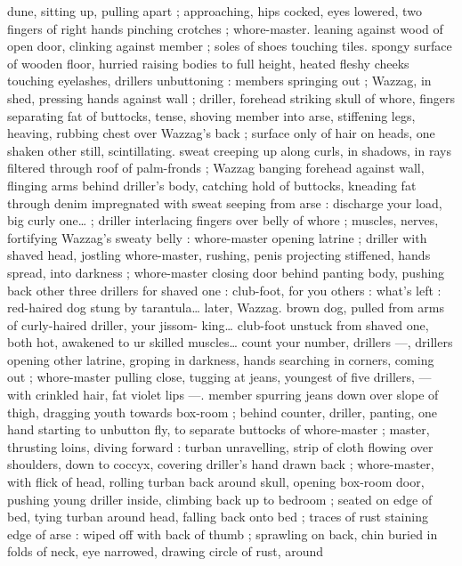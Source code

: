 dune, sitting up, pulling apart ; approaching, hips cocked, eyes 
lowered, two fingers of right hands pinching crotches ; whore-master. 
leaning against wood of open door, clinking against member ; soles 
of shoes touching tiles. spongy surface of wooden floor, hurried 
raising bodies to full height, heated fleshy cheeks touching 
eyelashes, drillers unbuttoning : members springing out ; Wazzag, in 
shed, pressing hands against wall ; driller, forehead striking skull of 
whore, fingers separating fat of buttocks, tense, shoving member 
into arse, stiffening legs, heaving, rubbing chest over Wazzag's back 
; surface only of hair on heads, one shaken other still, scintillating. 
sweat creeping up along curls, in shadows, in rays filtered through 
roof of palm-fronds ; Wazzag banging forehead against wall, flinging 
arms behind driller's body, catching hold of buttocks, kneading fat 
through denim impregnated with sweat seeping from arse :{\td} {\gl}{\td} 
discharge your load, big curly one{\ldots}{\gr} ; driller interlacing fingers over 
belly of whore ; muscles, nerves, fortifying Wazzag's sweaty belly : 
whore-master opening latrine ; driller with shaved head, jostling 
whore-master, rushing, penis projecting stiffened, hands spread, into 
darkness ; whore-master closing door behind panting body, pushing 
back other three drillers{\td} {\gl} for shaved one : club-foot, for you others 
: what's left : red-haired dog stung by tarantula{\ldots} later, Wazzag. 
brown dog, pulled from arms of curly-haired driller, your jissom- 
king{\ldots} club-foot unstuck from shaved one, both hot, awakened to 
ur skilled muscles{\ldots} count your number, drillers{\td} {\gr} ---, drillers 
opening other latrine, groping in darkness, hands searching in 
corners, coming out ; whore-master pulling close, tugging at jeans, 
youngest of five drillers, --- with crinkled hair, fat violet lips ---. 
member spurring jeans down over slope of thigh, dragging youth 
towards box-room ; behind counter, driller, panting, one hand 
starting to unbutton fly, to separate buttocks of whore-master ; 
master, thrusting loins, diving forward : turban unravelling, strip of 
cloth flowing over shoulders, down to coccyx, covering driller's hand 
drawn back ; whore-master, with flick of head, rolling turban back 
around skull, opening box-room door, pushing young driller inside, 
climbing back up to bedroom ; seated on edge of bed, tying turban 
around head, falling back onto bed ; traces of rust staining edge of 
arse : wiped off with back of thumb ; sprawling on back, chin buried 
in folds of neck, eye narrowed, drawing circle of rust, around 
